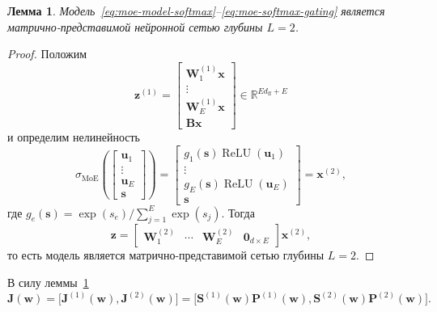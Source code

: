 \documentclass[11pt]{extarticle}
\DeclareMathOperator{\ReLU}{ReLU}
\newtheorem{lemma}{Лемма}
\theoremstyle{definition}
\theoremstyle{plain}
\theoremstyle{remark}
\begin{document}
\begin{lemma}
\label{lem:moe-matricized}
Модель~\eqref{eq:moe-model-softmax}--\eqref{eq:moe-softmax-gating} является матрично-представимой нейронной сетью глубины $L=2$.
\end{lemma}

\begin{proof}
Положим
$$
\mathbf z^{(1)}
=
\begin{bmatrix}
\mathbf W_1^{(1)}\mathbf x\\
\vdots\\
\mathbf W_E^{(1)}\mathbf x\\
\mathbf B\mathbf x
\end{bmatrix}
\in\mathbb R^{Ed_{\mathrm{ff}}+E}
$$
и определим нелинейность
$$
\sigma_{\mathrm{MoE}}
\!\left(
\begin{bmatrix}
\mathbf u_1\\
\vdots\\
\mathbf u_E\\
\mathbf s
\end{bmatrix}
\right)
=
\begin{bmatrix}
g_1(\mathbf s)\ReLU(\mathbf u_1)\\
\vdots\\
g_E(\mathbf s)\ReLU(\mathbf u_E)\\
\mathbf s
\end{bmatrix}
=
\mathbf x^{(2)},
$$
где $g_e(\mathbf s)=\exp(s_e)/\sum_{j=1}^{E}\exp(s_j)$. Тогда
$$
\mathbf z
=
\begin{bmatrix}
\mathbf W_1^{(2)} & \cdots & \mathbf W_E^{(2)} & \mathbf 0_{d\times E}
\end{bmatrix}
\mathbf x^{(2)},
$$
то есть модель является матрично-представимой сетью глубины $L=2$.
\end{proof}

В силу леммы~\ref{lem:moe-matricized}
$$
\mathbf J(\mathbf w)
=
\bigl[
\mathbf J^{(1)}(\mathbf w),\mathbf J^{(2)}(\mathbf w)
\bigr]
=
\bigl[
\mathbf S^{(1)}(\mathbf w)\mathbf P^{(1)}(\mathbf w),
\mathbf S^{(2)}(\mathbf w)\mathbf P^{(2)}(\mathbf w)
\bigr].
$$
\end{document}
